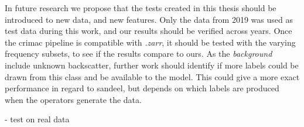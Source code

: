     
    In future research we propose that the tests created in this thesis should be introduced to new data, and new features. Only the data from 2019 was used as test data during this work, and our results should be verified across years. Once the \gls{crimac} pipeline is compatible with \textit{.zarr}, it should be tested with the varying frequency subsets, to see if the results compare to ours. As the \textit{background} include unknown backscatter, further work should identify if more labels could be drawn from this class and be available to the model. This could give a more exact performance in regard to sandeel, but depends on which labels are produced when the operators generate the data.
    
    - test on real data
    
    
    
    
 